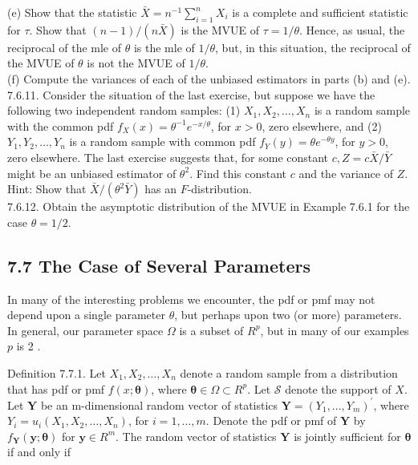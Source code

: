 (e) Show that the statistic $\bar{X}=n^{-1} \sum_{i=1}^{n} X_{i}$ is a complete and sufficient statistic for $\tau$. Show that $(n-1) /(n \bar{X})$ is the MVUE of $\tau=1 / \theta$. Hence, as usual, the reciprocal of the mle of $\theta$ is the mle of $1 / \theta$, but, in this situation, the reciprocal of the MVUE of $\theta$ is not the MVUE of $1 / \theta$.\\
(f) Compute the variances of each of the unbiased estimators in parts (b) and (e).\\
7.6.11. Consider the situation of the last exercise, but suppose we have the following two independent random samples: (1) $X_{1}, X_{2}, \ldots, X_{n}$ is a random sample with the common pdf $f_{X}(x)=\theta^{-1} e^{-x / \theta}$, for $x>0$, zero elsewhere, and (2) $Y_{1}, Y_{2}, \ldots, Y_{n}$ is a random sample with common pdf $f_{Y}(y)=\theta e^{-\theta y}$, for $y>0$, zero elsewhere. The last exercise suggests that, for some constant $c, Z=c \bar{X} / \bar{Y}$ might be an unbiased estimator of $\theta^{2}$. Find this constant $c$ and the variance of $Z$.\\
Hint: Show that $\bar{X} /\left(\theta^{2} \bar{Y}\right)$ has an $F$-distribution.\\
7.6.12. Obtain the asymptotic distribution of the MVUE in Example 7.6.1 for the case $\theta=1 / 2$.

\subsection*{7.7 The Case of Several Parameters}
In many of the interesting problems we encounter, the pdf or pmf may not depend upon a single parameter $\theta$, but perhaps upon two (or more) parameters. In general, our parameter space $\Omega$ is a subset of $R^{p}$, but in many of our examples $p$ is 2 .

Definition 7.7.1. Let $X_{1}, X_{2}, \ldots, X_{n}$ denote a random sample from a distribution that has pdf or pmf $f(x ; \boldsymbol{\theta})$, where $\boldsymbol{\theta} \in \Omega \subset R^{p}$. Let $\mathcal{S}$ denote the support of $X$. Let $\mathbf{Y}$ be an m-dimensional random vector of statistics $\mathbf{Y}=\left(Y_{1}, \ldots, Y_{m}\right)^{\prime}$, where $Y_{i}=u_{i}\left(X_{1}, X_{2}, \ldots, X_{n}\right)$, for $i=1, \ldots, m$. Denote the pdf or pmf of $\mathbf{Y}$ by $f_{\mathbf{Y}}(\mathbf{y} ; \boldsymbol{\theta})$ for $\mathbf{y} \in R^{m}$. The random vector of statistics $\mathbf{Y}$ is jointly sufficient for $\boldsymbol{\theta}$ if and only if

